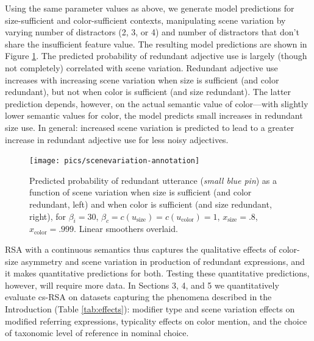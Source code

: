 \documentclass[11pt]{article}
\newcommand{\tableref}[1]{Table \ref{#1}}
\newcommand{\figref}[1]{Figure \ref{#1}}
\begin{document}
Using the same parameter values as above, 
we generate model predictions for size-sufficient and color-sufficient contexts, manipulating scene variation by varying number of distractors (2, 3, or 4) and number of distractors that don't share the insufficient feature value. The resulting model predictions are shown in \figref{fig:numdistractors}. The predicted probability of redundant adjective use is largely (though not completely) correlated with scene variation.
Redundant adjective use increases with increasing scene variation when size is sufficient (and color redundant), but not when color is sufficient (and size redundant). 
The latter prediction depends, however, on the actual semantic value of color---with slightly lower semantic values for color, the model predicts small increases in redundant size use. 
In general: increased scene variation is predicted to lead to a greater increase in redundant adjective use for less noisy adjectives.

\begin{figure}
\centering
\texttt{[image: pics/scenevariation-annotation]}
\caption{Predicted probability of redundant utterance (\emph{small blue pin}) as a function of scene variation when size is sufficient (and color redundant, left) and when color is sufficient (and size redundant, right), for $\beta_i = 30$, $ \beta_c = c(u_{\textrm{size}}) = c(u_{\textrm{color}}) = 1$, $x_{\text{size}} = .8$, $x_{\text{color}} = .999$. Linear smoothers overlaid.}
\label{fig:numdistractors}
\end{figure}



RSA with a continuous semantics thus captures the qualitative effects of color-size asymmetry and scene variation in production of redundant expressions, and it makes quantitative predictions for both. Testing these quantitative predictions, however, will require more data. 
In Sections 3, 4, and 5 we quantitatively evaluate cs-RSA on datasets capturing the phenomena described in the Introduction (\tableref{tab:effects}): modifier type and scene variation effects on modified referring expressions, typicality effects on color mention, and the choice of taxonomic level of reference in nominal choice.
\end{document}
